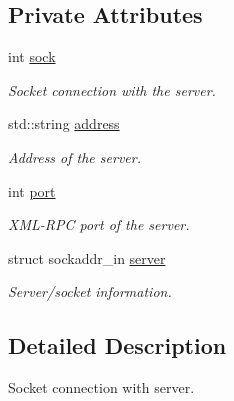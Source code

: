 \subsection*{Private Attributes}
\begin{DoxyCompactItemize}
\item 
\hypertarget{classTcpClient_af93f7c8c4d91d93379ba99fd3742c3dc}{int \hyperlink{classTcpClient_af93f7c8c4d91d93379ba99fd3742c3dc}{sock}}\label{classTcpClient_af93f7c8c4d91d93379ba99fd3742c3dc}

\begin{DoxyCompactList}\small\item\em Socket connection with the server. \end{DoxyCompactList}\item 
\hypertarget{classTcpClient_a8bcb24ebf1d8e22e9185f3056fd108c4}{std\-::string \hyperlink{classTcpClient_a8bcb24ebf1d8e22e9185f3056fd108c4}{address}}\label{classTcpClient_a8bcb24ebf1d8e22e9185f3056fd108c4}

\begin{DoxyCompactList}\small\item\em Address of the server. \end{DoxyCompactList}\item 
\hypertarget{classTcpClient_aa112ef0470437e790931b3ec9c98a800}{int \hyperlink{classTcpClient_aa112ef0470437e790931b3ec9c98a800}{port}}\label{classTcpClient_aa112ef0470437e790931b3ec9c98a800}

\begin{DoxyCompactList}\small\item\em X\-M\-L-\/\-R\-P\-C port of the server. \end{DoxyCompactList}\item 
\hypertarget{classTcpClient_a75a8bd28eca3f1eea17fb430ab14cade}{struct sockaddr\-\_\-in \hyperlink{classTcpClient_a75a8bd28eca3f1eea17fb430ab14cade}{server}}\label{classTcpClient_a75a8bd28eca3f1eea17fb430ab14cade}

\begin{DoxyCompactList}\small\item\em Server/socket information. \end{DoxyCompactList}\end{DoxyCompactItemize}


\subsection{Detailed Description}
Socket connection with server. 

